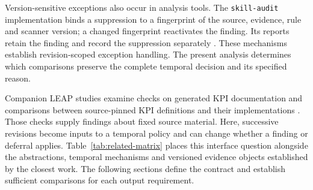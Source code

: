 \documentclass[preprint,11pt]{elsarticle}
\newcommand{\code}[1]{\texttt{#1}}
\begin{document}
Version-sensitive exceptions also occur in analysis tools. The \code{skill-audit} implementation binds a suppression to a fingerprint of the source, evidence, rule and scanner version; a changed fingerprint reactivates the finding. Its reports retain the finding and record the suppression separately \cite{skillaudit2026suppression}. These mechanisms establish revision-scoped exception handling. The present analysis determines which comparisons preserve the complete temporal decision and its specified reason.

Companion LEAP studies examine checks on generated KPI documentation and comparisons between source-pinned KPI definitions and their implementations \cite{mouawadjones2026checks,mouawad2026discrepancies}. Those checks supply findings about fixed source material. Here, successive revisions become inputs to a temporal policy and can change whether a finding or deferral applies. Table~\ref{tab:related-matrix} places this interface question alongside the abstractions, temporal mechanisms and versioned evidence objects established by the closest work. The following sections define the contract and establish sufficient comparisons for each output requirement.
\end{document}
